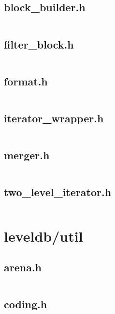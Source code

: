 \documentclass{article}
\begin{document}
\subsection{block\_builder.h}
\inputminted{cpp}{/home/dufferzafar/dev/@clones/bitcoin/src/leveldb/table/block_builder.h}
\newpage

\subsection{filter\_block.h}
\inputminted{cpp}{/home/dufferzafar/dev/@clones/bitcoin/src/leveldb/table/filter_block.h}
\newpage

\subsection{format.h}
\inputminted{cpp}{/home/dufferzafar/dev/@clones/bitcoin/src/leveldb/table/format.h}
\newpage

\subsection{iterator\_wrapper.h}
\inputminted{cpp}{/home/dufferzafar/dev/@clones/bitcoin/src/leveldb/table/iterator_wrapper.h}
\newpage

\subsection{merger.h}
\inputminted{cpp}{/home/dufferzafar/dev/@clones/bitcoin/src/leveldb/table/merger.h}
\newpage

\subsection{two\_level\_iterator.h}
\inputminted{cpp}{/home/dufferzafar/dev/@clones/bitcoin/src/leveldb/table/two_level_iterator.h}
\newpage

\section{leveldb/util}

\subsection{arena.h}
\inputminted{cpp}{/home/dufferzafar/dev/@clones/bitcoin/src/leveldb/util/arena.h}
\newpage

\subsection{coding.h}
\inputminted{cpp}{/home/dufferzafar/dev/@clones/bitcoin/src/leveldb/util/coding.h}
\newpage
\end{document}
